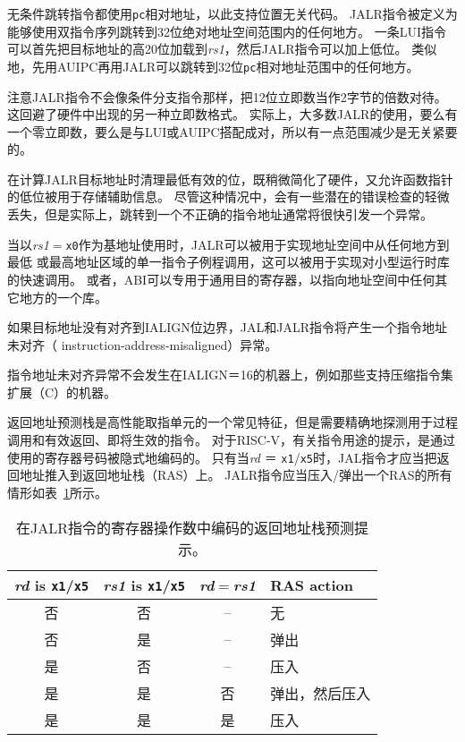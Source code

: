 \begin{commentary}

无条件跳转指令都使用{\tt pc}相对地址，以此支持位置无关代码。
JALR指令被定义为能够使用双指令序列跳转到32位绝对地址空间范围内的任何地方。
一条LUI指令可以首先把目标地址的高20位加载到{\em rs1}，然后JALR指令可以加上低位。
类似地，先用AUIPC再用JALR可以跳转到32位{\tt pc}相对地址范围中的任何地方。

注意JALR指令不会像条件分支指令那样，把12位立即数当作2字节的倍数对待。这回避了硬件中出现的另一种立即数格式。
实际上，大多数JALR的使用，要么有一个零立即数，要么是与LUI或AUIPC搭配成对，所以有一点范围减少是无关紧要的。

在计算JALR目标地址时清理最低有效的位，既稍微简化了硬件，又允许函数指针的低位被用于存储辅助信息。
尽管这种情况中，会有一些潜在的错误检查的轻微丢失，但是实际上，跳转到一个不正确的指令地址通常将很快引发一个异常。

当以{\em rs1}$=${\tt x0}作为基地址使用时，JALR可以被用于实现地址空间中从任何地方到最低
或最高地址区域的单一指令子例程调用，这可以被用于实现对小型运行时库的快速调用。
或者，ABI可以专用于通用目的寄存器，以指向地址空间中任何其它地方的一个库。
\end{commentary}

如果目标地址没有对齐到IALIGN位边界，JAL和JALR指令将产生一个指令地址未对齐（ instruction-address-misaligned）异常。

\begin{commentary}

指令地址未对齐异常不会发生在IALIGN＝16的机器上，例如那些支持压缩指令集扩展（C）的机器。
\end{commentary}

返回地址预测栈是高性能取指单元的一个常见特征，但是需要精确地探测用于过程调用和有效返回、即将生效的指令。
对于RISC-V，有关指令用途的提示，是通过使用的寄存器号码被隐式地编码的。
只有当{\em rd} ＝ {\tt x1}/{\tt x5}时，JAL指令才应当把返回地址推入到返回地址栈（RAS）上。
JALR指令应当压入/弹出一个RAS的所有情形如表~\ref{rashints}所示。

\begin{table}[hbt]
\centering
\begin{tabular}{|c|c|c|l|}
  \hline
  \textit{rd} is \texttt{x1}/\texttt{x5}
      & \textit{rs1} is \texttt{x1}/\texttt{x5}
            & \textit{rd}$=$\textit{rs1} & RAS action \\
  \hline
  否  & 否  & --  & 无 \\
  否  & 是 & --  & 弹出 \\
  是 & 否  & --  & 压入 \\
  是 & 是 & 否  & 弹出，然后压入 \\
  是 & 是 & 是 & 压入 \\
   \hline
\end{tabular}
\caption{在JALR指令的寄存器操作数中编码的返回地址栈预测提示。}
\label{rashints}
\end{table}

